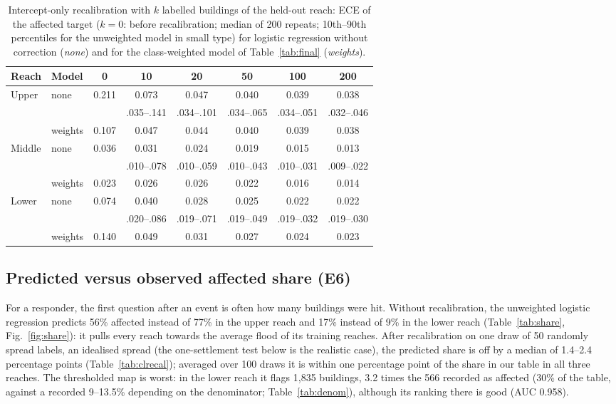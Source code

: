 \documentclass[journal,a4paper]{IEEEtran}
\begin{document}
\begin{table}[t]
\centering\scriptsize
\setlength{\tabcolsep}{3pt}
\caption{Intercept-only recalibration with $k$ labelled buildings of the held-out reach: ECE of the affected target ($k = 0$: before recalibration; median of 200 repeats; 10th--90th percentiles for the unweighted model in small type) for logistic regression without correction (\emph{none}) and for the class-weighted model of Table~\ref{tab:final} (\emph{weights}).}\label{tab:recal}
\begin{tabular}{@{}llcccccc@{}}
\toprule
\textbf{Reach} & \textbf{Model} & \textbf{0} & \textbf{10} & \textbf{20} & \textbf{50} & \textbf{100} & \textbf{200}\\
\midrule
Upper & none & 0.211 & 0.073 & 0.047 & 0.040 & 0.039 & 0.038\\
 & & & {\scriptsize .035--.141} & {\scriptsize .034--.101} & {\scriptsize .034--.065} & {\scriptsize .034--.051} & {\scriptsize .032--.046}\\
 & weights & 0.107 & 0.047 & 0.044 & 0.040 & 0.039 & 0.038\\
Middle & none & 0.036 & 0.031 & 0.024 & 0.019 & 0.015 & 0.013\\
 & & & {\scriptsize .010--.078} & {\scriptsize .010--.059} & {\scriptsize .010--.043} & {\scriptsize .010--.031} & {\scriptsize .009--.022}\\
 & weights & 0.023 & 0.026 & 0.026 & 0.022 & 0.016 & 0.014\\
Lower & none & 0.074 & 0.040 & 0.028 & 0.025 & 0.022 & 0.022\\
 & & & {\scriptsize .020--.086} & {\scriptsize .019--.071} & {\scriptsize .019--.049} & {\scriptsize .019--.032} & {\scriptsize .019--.030}\\
 & weights & 0.140 & 0.049 & 0.031 & 0.027 & 0.024 & 0.023\\
\bottomrule
\end{tabular}
\end{table}

\subsection{Predicted versus observed affected share (E6)}\label{sec:share}
For a responder, the first question after an event is often how many buildings were hit. Without recalibration, the unweighted logistic regression predicts 56\% affected instead of 77\% in the upper reach and 17\% instead of 9\% in the lower reach (Table~\ref{tab:share}, Fig.~\ref{fig:share}): it pulls every reach towards the average flood of its training reaches. After recalibration on one draw of 50 randomly spread labels, an idealised spread (the one-settlement test below is the realistic case), the predicted share is off by a median of 1.4--2.4 percentage points (Table~\ref{tab:clrecal}); averaged over 100 draws it is within one percentage point of the share in our table in all three reaches. The thresholded map is worst: in the lower reach it flags 1,835 buildings, 3.2 times the 566 recorded as affected (30\% of the table, against a recorded 9--13.5\% depending on the denominator; Table~\ref{tab:denom}), although its ranking there is good (AUC 0.958).
\end{document}
